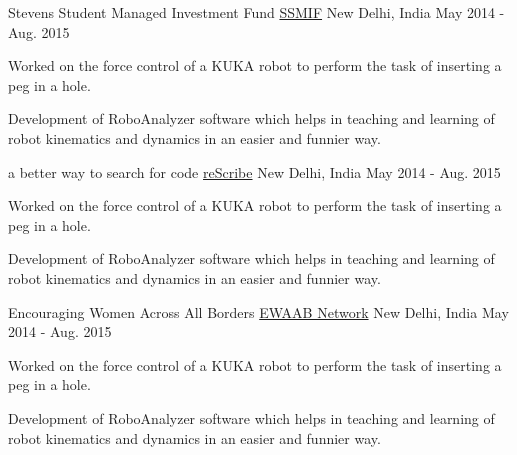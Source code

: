 

\begin{cventries}

  \cventry
  {Stevens Student Managed Investment Fund} %
  {\href{https://bailey.ssmif.com}{SSMIF}} %
  {New Delhi, India} %
  {May 2014 - Aug. 2015} %
  {
    \begin{cvitems} %
      \item {Worked on the force control of a KUKA robot to perform the task of inserting a peg in a hole.}
      \item {Development of RoboAnalyzer software which helps in teaching and learning of robot kinematics and dynamics in an easier and funnier way.}
    \end{cvitems}
  }

  \cventry
  {a better way to search for code} %
  {\href{https://rescribe.dev}{reScribe}} %
  {New Delhi, India} %
  {May 2014 - Aug. 2015} %
  {
    \begin{cvitems} %
      \item {Worked on the force control of a KUKA robot to perform the task of inserting a peg in a hole.}
      \item {Development of RoboAnalyzer software which helps in teaching and learning of robot kinematics and dynamics in an easier and funnier way.}
    \end{cvitems}
  }

  \cventry
  {Encouraging Women Across All Borders} %
  {\href{https://ewaab.org}{EWAAB Network}} %
  {New Delhi, India} %
  {May 2014 - Aug. 2015} %
  {
    \begin{cvitems} %
      \item {Worked on the force control of a KUKA robot to perform the task of inserting a peg in a hole.}
      \item {Development of RoboAnalyzer software which helps in teaching and learning of robot kinematics and dynamics in an easier and funnier way.}
    \end{cvitems}
  }

\end{cventries}
